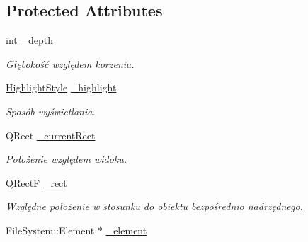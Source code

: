 \subsection*{Protected Attributes}
\begin{DoxyCompactItemize}
\item 
\hypertarget{class_tree_view_element_a6ea6ed383cb22e6adccf4343235e661b}{
int \hyperlink{class_tree_view_element_a6ea6ed383cb22e6adccf4343235e661b}{\_\-depth}}
\label{class_tree_view_element_a6ea6ed383cb22e6adccf4343235e661b}

\begin{DoxyCompactList}\small\item\em Głębokość względem korzenia. \item\end{DoxyCompactList}\item 
\hypertarget{class_tree_view_element_a2b7c8cbe571a71f6aca6788f85e0e370}{
\hyperlink{class_tree_view_element_a5253fdcb86d28b2545214d4d5e47af2c}{HighlightStyle} \hyperlink{class_tree_view_element_a2b7c8cbe571a71f6aca6788f85e0e370}{\_\-highlight}}
\label{class_tree_view_element_a2b7c8cbe571a71f6aca6788f85e0e370}

\begin{DoxyCompactList}\small\item\em Sposób wyświetlania. \item\end{DoxyCompactList}\item 
\hypertarget{class_tree_view_element_ab4a8438a9c84e5eb4f45c31194bb24dd}{
QRect \hyperlink{class_tree_view_element_ab4a8438a9c84e5eb4f45c31194bb24dd}{\_\-currentRect}}
\label{class_tree_view_element_ab4a8438a9c84e5eb4f45c31194bb24dd}

\begin{DoxyCompactList}\small\item\em Położenie względem widoku. \item\end{DoxyCompactList}\item 
\hypertarget{class_tree_view_element_ac29c214e7418d303ad7599f637d90b56}{
QRectF \hyperlink{class_tree_view_element_ac29c214e7418d303ad7599f637d90b56}{\_\-rect}}
\label{class_tree_view_element_ac29c214e7418d303ad7599f637d90b56}

\begin{DoxyCompactList}\small\item\em Względne położenie w stosunku do obiektu bezpośrednio nadrzędnego. \item\end{DoxyCompactList}\item 
\hypertarget{class_tree_view_element_a9c3568bdc2697e608d0e20c767a4877b}{
FileSystem::Element $\ast$ \hyperlink{class_tree_view_element_a9c3568bdc2697e608d0e20c767a4877b}{\_\-element}}
\label{class_tree_view_element_a9c3568bdc2697e608d0e20c767a4877b}


\end{DoxyCompactItemize}
